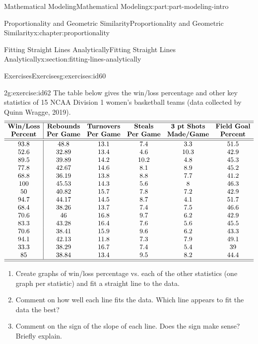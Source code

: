 \documentclass[oneside,10pt,]{book}
\numberwithin{equation}{section}
\begin{document}
\begin{partptx}{Mathematical Modeling}{}{Mathematical Modeling}{}{}{x:part:part-modeling-intro}
\begin{chapterptx}{Proportionality and Geometric Similarity}{}{Proportionality and Geometric Similarity}{}{}{x:chapter:proportionality}
\begin{sectionptx}{Fitting Straight Lines Analytically}{}{Fitting Straight Lines Analytically}{}{}{x:section:fitting-lines-analytically}
\begin{exercises-subsection-numberless}{Exercises}{}{Exercises}{}{}{g:exercises:id60}
\begin{divisionexercise}{2}{}{}{g:exercise:id62}%
The table below gives the win\slash{}loss percentage and other key statistics of 15 NCAA Division 1 women’s basketball teams (data collected by Quinn Wragge, 2019).%
%
\begin{equation*}
\begin{array}{c|ccccc}\hline\hline
\textbf{Win/Loss} & \textbf{Rebounds} & \textbf{Turnovers} & \textbf{Steals} & \textbf{3 pt Shots} & \textbf{Field Goal} \\
\textbf{Percent} & \textbf{Per Game} & \textbf{Per Game} & \textbf{Per Game} & \textbf{Made/Game} & \textbf{Percent} \\\hline\hline
93.8 & 48.8 & 13.1 & 7.4 & 3.3 & 51.5 \\
52.6 & 32.89 & 13.4 & 4.6 & 10.3 & 42.9 \\
89.5 & 39.89 & 14.2 & 10.2 & 4.8 & 45.3 \\
77.8 & 42.67 & 14.6 & 8.1 & 8.9 & 45.2 \\
68.8 & 36.19 & 13.8 & 8.8 & 7.7 & 41.2 \\
100 & 45.53 & 14.3 & 5.6 & 8 & 46.3 \\
50 & 40.82 & 15.7 & 7.8 & 7.2 & 42.9 \\
94.7 & 44.17 & 14.5 & 8.7 & 4.1 & 51.7 \\
68.4 & 38.26 & 13.7 & 7.4 & 7.5 & 46.6 \\
70.6 & 46 & 16.8 & 9.7 & 6.2 & 42.9 \\
83.3 & 43.28 & 16.4 & 7.6 & 5.6 & 45.5 \\
70.6 & 38.41 & 15.9 & 9.6 & 6.2 & 43.3 \\
94.1 & 42.13 & 11.8 & 7.3 & 7.9 & 49.1 \\
33.3 & 38.29 & 16.7 & 7.4 & 5.4 & 39 \\
85 & 38.84 & 13.4 & 9.5 & 8.2 & 44.4 \\\hline\hline
\end{array}
\end{equation*}
\begin{enumerate}[font=\bfseries,label=(\alph*),ref=\alph*]
\item{}Create graphs of win\slash{}loss percentage vs. each of the other statistics (one graph per statistic) and fit a straight line to the data.%
\item{}Comment on how well each line fits the data. Which line appears to fit the data the best?%
\item{}Comment on the sign of the slope of each line. Does the sign make sense? Briefly explain.%

\end{enumerate}
\end{divisionexercise}
\end{exercises-subsection-numberless}
\end{sectionptx}
\end{chapterptx}
\end{partptx}
\end{document}
